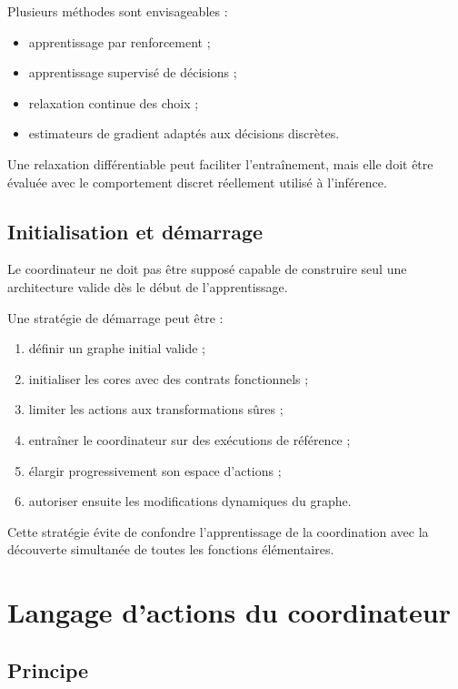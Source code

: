 \documentclass[11pt,a4paper]{article}
\begin{document}
Plusieurs méthodes sont envisageables :
\begin{itemize}
  \item apprentissage par renforcement ;
  \item apprentissage supervisé de décisions ;
  \item relaxation continue des choix ;
  \item estimateurs de gradient adaptés aux décisions discrètes.
\end{itemize}

Une relaxation différentiable peut faciliter l'entraînement,
mais elle doit être évaluée avec le comportement discret réellement
utilisé à l'inférence.

\subsection{Initialisation et démarrage}

Le coordinateur ne doit pas être supposé capable de construire
seul une architecture valide dès le début de l'apprentissage.

Une stratégie de démarrage peut être :

\begin{enumerate}
  \item définir un graphe initial valide ;
  \item initialiser les cores avec des contrats fonctionnels ;
  \item limiter les actions aux transformations sûres ;
  \item entraîner le coordinateur sur des exécutions de référence ;
  \item élargir progressivement son espace d'actions ;
  \item autoriser ensuite les modifications dynamiques du graphe.
\end{enumerate}

Cette stratégie évite de confondre l'apprentissage de la coordination
avec la découverte simultanée de toutes les fonctions élémentaires.

\section{Langage d'actions du coordinateur}

\subsection{Principe}
\end{document}
